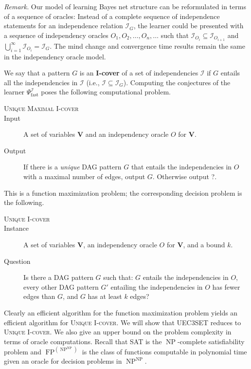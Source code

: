 \documentclass{elsarticle}%
\DeclareMathOperator{\FP}{\mathbf{\mathrm{FP}}}
\DeclareMathOperator{\NP}{\mathbf{\mathrm{NP}}}
\newcommand{\G}{G}
\newcommand{\fast}{\mathrm{fast}}
\newcommand{\I}{\mathcal{I}}
\begin{document}
{\em Remark.} Our model of learning Bayes net structure can be reformulated in terms of a sequence of oracles: Instead of a complete sequence of independence statements for an independence relation $\I_G$, the learner could be presented with a sequence of independency oracles
$O_1,O_2,\ldots,O_n,\ldots$ such that $\I_{O_i} \subseteq \I_{O_{i+1}}$ and $\bigcup_{i=1}^{\infty} \I_{O_i} = \I_G$. 
The mind change and convergence time results remain the same in the independency oracle model.

We say that a pattern $\G$ is an {\bf I-cover} of a set of independencies $\I$ if $\G$ entails all the independencies in $\I$ (i.e., $\I \subseteq \I_{\G}$).
Computing the conjectures of the 
learner $\Psi^{\I}_{\fast}$ poses the following computational problem.


\begin{description}
\item[\textsc{Unique Maximal I-cover}]
\item[Input] A set of variables \textbf{V} and an independency oracle $O$
for \textbf{V}.
\item[Output] If there is a \emph{unique} DAG pattern $G$ that entails the
independencies in $O$ with a maximal number of edges, output $G$. Otherwise
output ?.
\end{description}
This is a function maximization problem; the corresponding decision problem is the following.%
\begin{description}
\item[\textsc{Unique I-cover} ]
\item[Instance] A set of variables \textbf{V}, an independency oracle $O$
for \textbf{V}, and a bound $k$.
\item[Question] Is there a DAG pattern $G$ such that: $G$ entails the
  independencies in $O$, every other DAG pattern $G'$
  entailing the independencies in
  $O$ has fewer edges than $G$,
  and $G$ has at least $k$ edges?
\end{description}
%
Clearly an efficient algorithm for the function maximization problem yields an
efficient algorithm for \textsc{Unique I-cover}. We will
show that \textsc{UEC3SET} reduces to \textsc{Unique I-cover}. We also give an upper bound on the problem complexity in terms of oracle computations. Recall that \textsc{SAT} is the $\NP$-complete satisfiability problem and $\FP^{(\NP^{\NP})}$ is the class of functions computable in polynomial time given an oracle for decision problems in $\NP^{\NP}$.
\end{document}

